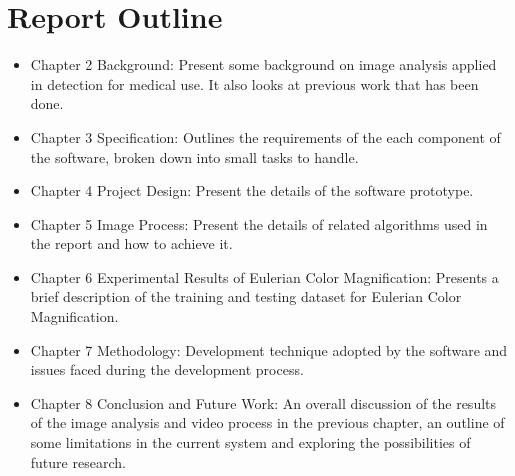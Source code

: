 \section{Report Outline}
\begin{itemize}
    \item Chapter 2 Background: Present some background on image analysis applied in detection for medical use. It also looks at previous work that has been done. 
    \item Chapter 3 Specification: Outlines the requirements of the each component of the software, broken down into small tasks to handle.
    \item Chapter 4 Project Design: Present the details of the software prototype.
    \item Chapter 5 Image Process: Present the details of related algorithms used in the report and how to achieve it.
    \item Chapter 6 Experimental Results of Eulerian Color Magnification: Presents a brief description of the training and testing dataset for Eulerian Color Magnification.
    \item Chapter 7 Methodology: Development technique adopted by the software and issues faced during the development process.
    \item Chapter 8 Conclusion and Future Work:  An overall discussion of the results of the image analysis and video process in the previous chapter, an outline of some limitations in the current system and exploring the possibilities of future research.
\end{itemize}





